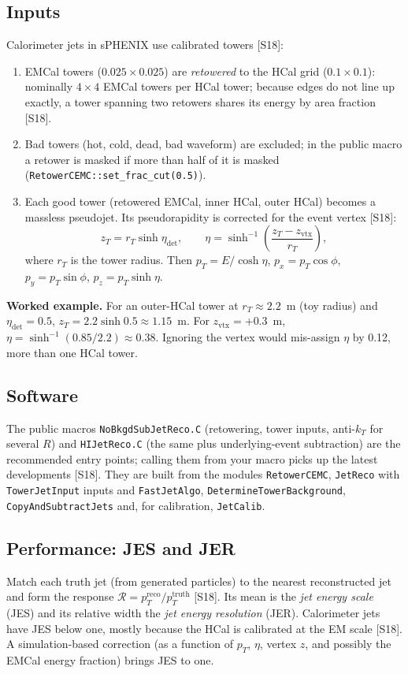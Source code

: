 \documentclass[11pt,letterpaper]{article}
\begin{document}
\subsection{Inputs}
Calorimeter jets in sPHENIX use calibrated towers [S18]:
\begin{enumerate}
\item EMCal towers ($0.025\times0.025$) are \emph{retowered} to the HCal grid ($0.1\times0.1$): nominally $4\times4$ EMCal towers per HCal tower; because edges do not line up exactly, a tower spanning two retowers shares its energy by area fraction [S18].
\item Bad towers (hot, cold, dead, bad waveform) are excluded; in the public macro a retower is masked if more than half of it is masked (\texttt{RetowerCEMC::set\_frac\_cut(0.5)}).
\item Each good tower (retowered EMCal, inner HCal, outer HCal) becomes a massless pseudojet. Its pseudorapidity is corrected for the event vertex [S18]:
\begin{equation}
z_T = r_T\sinh\eta_{\mathrm{det}},\qquad \eta = \sinh^{-1}\!\left(\frac{z_T-z_{\mathrm{vtx}}}{r_T}\right),
\end{equation}
where $r_T$ is the tower radius. Then $p_T=E/\cosh\eta$, $p_x=p_T\cos\phi$, $p_y=p_T\sin\phi$, $p_z=p_T\sinh\eta$.
\end{enumerate}
\textbf{Worked example.} For an outer-HCal tower at $r_T\approx2.2$~m (toy radius) and $\eta_{\mathrm{det}}=0.5$, $z_T=2.2\sinh0.5\approx1.15$~m. For $z_{\mathrm{vtx}}=+0.3$~m,
$\eta=\sinh^{-1}(0.85/2.2)\approx0.38$. Ignoring the vertex would mis-assign $\eta$ by 0.12, more than one HCal tower.

\subsection{Software}
The public macros \texttt{NoBkgdSubJetReco.C} (retowering, tower inputs, anti-$k_T$ for several $R$) and \texttt{HIJetReco.C} (the same plus underlying-event subtraction) are the recommended entry points; calling them from your macro picks up the latest developments [S18].
They are built from the modules \texttt{RetowerCEMC}, \texttt{JetReco} with \texttt{TowerJetInput} inputs and \texttt{FastJetAlgo}, \texttt{DetermineTowerBackground}, \texttt{CopyAndSubtractJets} and, for calibration, \texttt{JetCalib}.

\subsection{Performance: JES and JER}
Match each truth jet (from generated particles) to the nearest reconstructed jet and form the response $\mathcal{R}=p_T^{\mathrm{reco}}/p_T^{\mathrm{truth}}$ [S18].
Its mean is the \emph{jet energy scale} (JES) and its relative width the \emph{jet energy resolution} (JER).
Calorimeter jets have JES below one, mostly because the HCal is calibrated at the EM scale [S18]. A simulation-based correction (as a function of $p_T$, $\eta$, vertex $z$, and possibly the EMCal energy fraction) brings JES to one.
\end{document}
